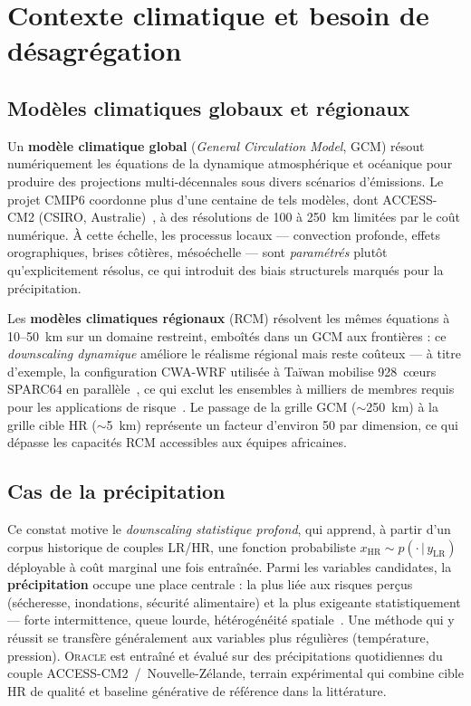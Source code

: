 \documentclass[14pt,a4paper,openany]{extreport}
\newcommand{\Oracle}{\textsc{Oracle}}
\newcommand{\LR}{\ensuremath{\text{LR}}}
\newcommand{\HR}{\ensuremath{\text{HR}}}
\newcommand{\xHR}{\ensuremath{x_{\HR}}}
\newcommand{\yLR}{\ensuremath{y_{\LR}}}
\begin{document}
\section{Contexte climatique et besoin de désagrégation}
\label{sec:contexte}

\subsection{Modèles climatiques globaux et régionaux}
\label{ssec:gcm-rcm}

Un \textbf{modèle climatique global} (\emph{General Circulation Model}, GCM) résout numériquement les équations de la dynamique atmosphérique et océanique pour produire des projections multi-décennales sous divers scénarios d'émissions. Le projet CMIP6 coordonne plus d'une centaine de tels modèles, dont ACCESS-CM2 (CSIRO, Australie)~\cite{eyring_cmip6_2016}, à des résolutions de 100 à 250~km limitées par le coût numérique. À cette échelle, les processus locaux --- convection profonde, effets orographiques, brises côtières, mésoéchelle --- sont \emph{paramétrés} plutôt qu'explicitement résolus, ce qui introduit des biais structurels marqués pour la précipitation.

Les \textbf{modèles climatiques régionaux} (RCM) résolvent les mêmes équations à 10--50~km sur un domaine restreint, emboîtés dans un GCM aux frontières : ce \emph{downscaling dynamique} améliore le réalisme régional mais reste coûteux --- à titre d'exemple, la configuration CWA-WRF utilisée à Taïwan mobilise 928~cœurs SPARC64 en parallèle~\cite{mardani_corrdiff_2023}, ce qui exclut les ensembles à milliers de membres requis pour les applications de risque~\cite{hobeichi_ml_downscaling_2023}. Le passage de la grille GCM ($\sim$250~km) à la grille cible HR ($\sim$5~km) représente un facteur d'environ 50 par dimension, ce qui dépasse les capacités RCM accessibles aux équipes africaines.\label{fig:resolutions}

\subsection{Cas de la précipitation}
\label{ssec:cas-precipitation}

Ce constat motive le \emph{downscaling statistique profond}, qui apprend, à partir d'un corpus historique de couples LR/HR, une fonction probabiliste $\xHR \sim p(\cdot\,|\,\yLR)$ déployable à coût marginal une fois entraînée. Parmi les variables candidates, la \textbf{précipitation} occupe une place centrale : la plus liée aux risques perçus (sécheresse, inondations, sécurité alimentaire) et la plus exigeante statistiquement --- forte intermittence, queue lourde, hétérogénéité spatiale~\cite{maraun_widmann_2018,vandal_deepsd_2017}. Une méthode qui y réussit se transfère généralement aux variables plus régulières (température, pression). \Oracle{} est entraîné et évalué sur des précipitations quotidiennes du couple ACCESS-CM2~/~Nouvelle-Zélande, terrain expérimental qui combine cible HR de qualité et baseline générative de référence dans la littérature.
\end{document}
